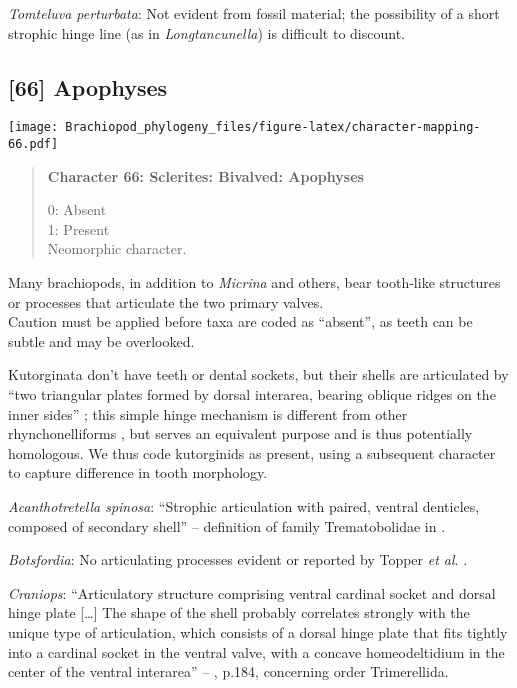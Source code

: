 \documentclass[openany]{book}
\theoremstyle{definition}
\theoremstyle{definition}
\theoremstyle{definition}
\theoremstyle{remark}
\begin{document}
\hypertarget{Tomteluva_perturbata-coding-65}{}
\emph{Tomteluva perturbata}: Not evident from fossil material; the
possibility of a short strophic hinge line (as in \emph{Longtancunella})
is difficult to discount.

\subsection*{{[}66{]} Apophyses}\label{apophyses}

\texttt{[image: Brachiopod\_phylogeny\_files/figure-latex/character-mapping-66.pdf]}

\begin{quote}
\textbf{Character 66: Sclerites: Bivalved: Apophyses}

0: Absent\\
1: Present\\
Neomorphic character.
\end{quote}

Many brachiopods, in addition to \emph{Micrina} and others, bear
tooth-like structures or processes that articulate the two primary
valves.\\
Caution must be applied before taxa are coded as ``absent'', as teeth
can be subtle and may be overlooked.

Kutorginata don't have teeth or dental sockets, but their shells are
articulated by ``two triangular plates formed by dorsal interarea,
bearing oblique ridges on the inner sides''
\citep[p.~211]{Williams2000LinguliformeaCraniiformea}; this simple hinge
mechanism is different from other rhynchonelliforms
\citep[p.208]{Williams2000LinguliformeaCraniiformea}, but serves an
equivalent purpose and is thus potentially homologous. We thus code
kutorginids as present, using a subsequent character to capture
difference in tooth morphology.

\hypertarget{Acanthotretella_spinosa-coding-66}{}
\emph{Acanthotretella spinosa}: ``Strophic articulation with paired,
ventral denticles, composed of secondary shell'' -- definition of family
Trematobolidae in \citet{Williams2000LinguliformeaCraniiformea}.

\hypertarget{Botsfordia-coding-66}{}
\emph{Botsfordia}: No articulating processes evident or reported by
Topper \emph{et al}. \citeyearpar{Topper2013Reappraisalof}.

\hypertarget{Craniops-coding-66}{}
\emph{Craniops}: ``Articulatory structure comprising ventral cardinal
socket and dorsal hinge plate {[}\ldots{}{]} The shape of the shell
probably correlates strongly with the unique type of articulation, which
consists of a dorsal hinge plate that fits tightly into a cardinal
socket in the ventral valve, with a concave homeodeltidium in the center
of the ventral interarea'' --
\citet{Williams2000LinguliformeaCraniiformea}, p.184, concerning order
Trimerellida.
\end{document}
